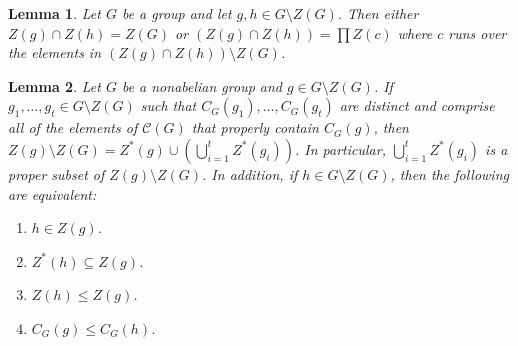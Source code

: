 \documentclass[10pt,a4paper]{amsart}
\newtheorem{lemma}{Lemma}
\begin{document}
\begin{lemma} \label{intersection}
Let $G$ be a group and let $g, h \in G \setminus Z(G)$.   Then either $Z(g) \cap Z(h) = Z(G)$ or $(Z(g) \cap Z(h)) = \prod Z(c)$ where $c$ runs over the elements in $(Z (g) \cap Z(h)) \setminus Z(G)$.
\end{lemma}

\begin{lemma} \label{star 2}
Let $G$ be a nonabelian group and $g \in G \setminus Z(G)$.  If $g_1, \dots, g_t \in G \setminus Z(G)$ such that $C_G (g_1), \dots, C_G (g_t)$ are distinct and comprise all of the elements of ${\mathcal C} (G)$ that properly contain $C_G (g)$, then $\displaystyle Z(g) \setminus Z(G) = Z^* (g) \cup (\bigcup_{i=1}^t Z^* (g_i))$.   In particular, $\displaystyle \bigcup_{i=1}^t Z^* (g_i)$ is a proper subset of $Z(g) \setminus Z(G)$. In addition, if $h \in G \setminus Z(G)$, then the following are equivalent:
\begin{enumerate}
\item $h \in Z(g)$.
\item $Z^* (h) \subseteq Z(g)$.
\item $Z(h) \le Z(g)$.
\item $C_G (g) \le C_G (h)$.
\end{enumerate}
\end{lemma}
\end{document}
